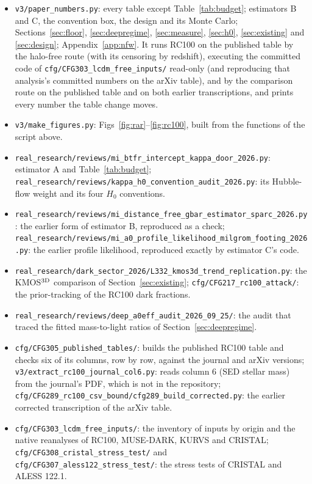 \documentclass[fleqn,usenatbib]{mnras}
\begin{document}
\begin{itemize}
\item \nolinkurl{v3/paper_numbers.py}: every table except Table~\ref{tab:budget}; estimators B and C, the convention box, the design and its Monte Carlo; Sections~\ref{sec:floor}, \ref{sec:deepregime}, \ref{sec:measure}, \ref{sec:h0}, \ref{sec:existing} and \ref{sec:design}; Appendix~\ref{app:nfw}. It runs RC100 on the published table by the halo-free route (with its censoring by redshift), executing the committed code of \nolinkurl{cfg/CFG303_lcdm_free_inputs/} read-only (and reproducing that analysis's committed numbers on the arXiv table), and by the comparison route on the published table and on both earlier transcriptions, and prints every number the table change moves.
\item \nolinkurl{v3/make_figures.py}: Figs~\ref{fig:rar}--\ref{fig:rc100}, built from the functions of the script above.
\item \nolinkurl{real_research/reviews/mi_btfr_intercept_kappa_door_2026.py}: estimator A and Table~\ref{tab:budget}; \nolinkurl{real_research/reviews/kappa_h0_convention_audit_2026.py}: its Hubble-flow weight and its four $H_0$ conventions.
\item \nolinkurl{real_research/reviews/mi_distance_free_gbar_estimator_sparc_2026.py}: the earlier form of estimator B, reproduced as a check; \nolinkurl{real_research/reviews/mi_a0_profile_likelihood_milgrom_footing_2026.py}: the earlier profile likelihood, reproduced exactly by estimator C's code.
\item \nolinkurl{real_research/dark_sector_2026/L332_kmos3d_trend_replication.py}: the KMOS$^{\rm 3D}$ comparison of Section~\ref{sec:existing}; \nolinkurl{cfg/CFG217_rc100_attack/}: the prior-tracking of the RC100 dark fractions.
\item \nolinkurl{real_research/reviews/deep_a0eff_audit_2026_09_25/}: the audit that traced the fitted mass-to-light ratios of Section~\ref{sec:deepregime}.
\item \nolinkurl{cfg/CFG305_published_tables/}: builds the published RC100 table and checks six of its columns, row by row, against the journal and arXiv versions; \nolinkurl{v3/extract_rc100_journal_col6.py}: reads column 6 (SED stellar mass) from the journal's PDF, which is not in the repository; \nolinkurl{cfg/CFG289_rc100_csv_bound/cfg289_build_corrected.py}: the earlier corrected transcription of the arXiv table.
\item \nolinkurl{cfg/CFG303_lcdm_free_inputs/}: the inventory of inputs by origin and the native reanalyses of RC100, MUSE-DARK, KURVS and CRISTAL; \nolinkurl{cfg/CFG308_cristal_stress_test/} and \nolinkurl{cfg/CFG307_aless122_stress_test/}: the stress tests of CRISTAL and ALESS 122.1.

\end{itemize}
\end{document}
